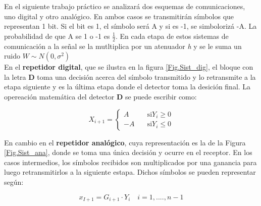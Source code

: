 	\indent En el siguiente trabajo práctico se analizará dos esquemas de comunicaciones, uno digital y otro analógico. En ambos casos se transmitirán símbolos que representan 1 bit. Si el bit es 1, el símbolo será A y si es -1, se simbolorizá -A. La probabilidad de que A se 1 o -1 es $\frac{1}{2}$. En cada etapa de estos sistemas de comunicación a la señal se la mutltiplica por un atenuador \emph{h} y se le suma un ruido $W \sim N(0,\sigma ^2)$\\
	
	\indent En el \textbf{repetidor digital}, que se ilustra en la figura \ref{Fig.Sist_dig}, el bloque con la letra \textbf{D} toma una decisión acerca del símbolo transmitido y lo retransmite a la etapa siguiente y es la última etapa donde el detector toma la desición final. La opereación matemática del detector \textbf{D} se puede escribir como:
	
						\begin{equation}
							X_{i+1}=
									\begin{cases}
											A		& \quad \text{si} Y_i \geq 0 \\
											-A		& \quad \text{si} Y_i \leq 0
									\end{cases}
						\label{Eq.sis.digital}
						\end{equation}

	\indent En cambio en el \textbf{repetidor analógico}, cuya representación es la de la Figura \ref{Fig.Sist_ana}, donde se toma una única decisión y ocurre en el receptor. En los casos intermedios, los símbolos recibidos son multiplicados por una ganancia para luego retransmitirlos a la siguiente estapa. Dichos símbolos se pueden representar según:
	
						\begin{equation}
							x_{I+1} = G_{i+1} \cdot Y_i \quad i=1,....,n-1
							\label{Eq.sis.analogico}
						\end{equation}
						

